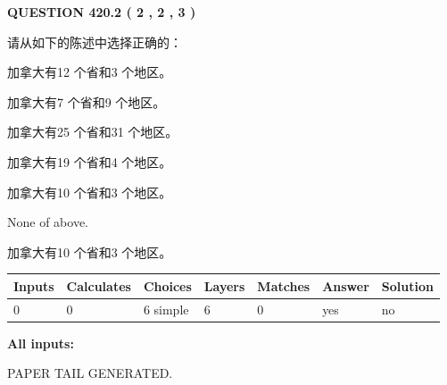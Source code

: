 \documentclass{ctexart}
\begin{document}
   
  
\vspace{0.2in}
  
{\textbf{\Large{QUESTION
420.2 
 ( 2 , 2 , 3 )
}}}
  
  
请从如下的陈述中选择正确的：
 
 
加拿大有12 个省和3 个地区。
 
 
加拿大有7 个省和9 个地区。
 
 
加拿大有25 个省和31 个地区。
 
 
加拿大有19 个省和4 个地区。
 
 
加拿大有10 个省和3 个地区。
 
 
 None of above.
 
 
\noindent{}
 
 
加拿大有10 个省和3 个地区。
 
 
\noindent{}
 
 
   
   
   
   
\noindent\begin{tabular}{|l|l|l|l|l|l|l|}
 \hline
Inputs & Calculates & Choices & Layers & Matches & Answer & Solution \\ \hline
 0  & 
 0  & 
 6
  simple  
  & 
 6  & 
 0  & 
  yes & 
  no 
  \\ \hline
 \end{tabular}
   
   
   
   
\noindent{}
   
   
   
   
\noindent\vspace{0.1in}\hspace{-0.08in} {\textbf{\Large{All inputs: }}}
   
   
   
   
   
   
 \vspace{0.2in}
 
   
   
\vspace{2.0in} PAPER TAIL GENERATED.
   
\end{document}
